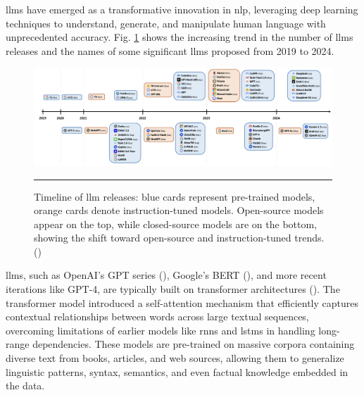 \glspl{llm} have emerged as a transformative innovation in \gls{nlp}, leveraging deep learning techniques to understand, generate, and manipulate human language with unprecedented accuracy.
Fig. \ref{fig:llms-over-the-years} shows the increasing trend in the number of \glspl{llm} releases and the names of some significant \glspl{llm} proposed from 2019 to 2024.

\begin{figure}[htbp]
    \centering
 \includegraphics[width=\textwidth]{03_Figures/literature-review/llms-over-the-years.png}
     \rule{35em}{0.5pt}
    \caption{Timeline of \gls{llm} releases: blue cards represent pre-trained models, orange cards denote instruction-tuned models. Open-source models appear on the top, while closed-source models are on the bottom, showing the shift toward open-source and instruction-tuned trends. (\cite{Naveed2023})}
 \label{fig:llms-over-the-years}
\end{figure}

\glspl{llm}, such as OpenAI's GPT series (\cite{Radford2018ImprovingLU}), Google's BERT (\cite{Devlin2019BERTPO}), and more recent iterations like GPT-4, are typically built on transformer architectures (\cite{Vaswani2017}).
The transformer model introduced a self-attention mechanism that efficiently captures contextual relationships between words across large textual sequences, overcoming limitations of earlier models like \glspl{rnn} and \glspl{lstm} in handling long-range dependencies.
These models are pre-trained on massive corpora containing diverse text from books, articles, and web sources, allowing them to generalize linguistic patterns, syntax, semantics, and even factual knowledge embedded in the data.


